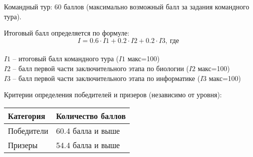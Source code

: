 Командный тур: 60 баллов (максимально возможный балл за задания командного тура).

Итоговый балл определяется по формуле:
$$I =0. 6 \cdot I1 + 0.2 \cdot I2 + 0.2 \cdot I3, \: \text{где}$$\\
$I1$ – итоговый балл командного тура ($I1$  макс=100)\\
$I2$ –  балл первой части заключительного этапа по биологии  ($I2$ макс=100)\\
$I3$ –  балл первой части заключительного этапа по информатике  ($I3$ макс=100)

Критерии определения победителей и призеров (независимо от уровня):
\begin{center} 
    \begin{tabular}{|l|l|}
        \hline
        Категория & Количество баллов \\
        \hline
        Победители & 60.4 балла и выше \\
        \hline
        Призеры & 54.4 балла и выше \\
        \hline
    \end{tabular} 
\end{center} 